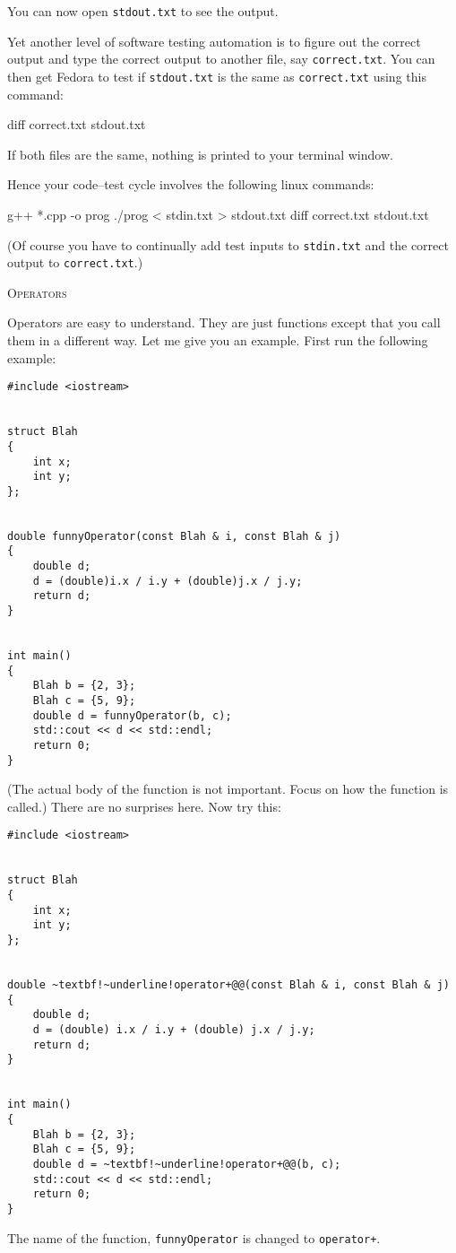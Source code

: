 You can now open \verb!stdout.txt! to see the output.

Yet another level of software testing automation is to figure out the correct
output and type the correct output to another file, say \verb!correct.txt!. You
can then get Fedora to test if \verb!stdout.txt! is the same as
\verb!correct.txt! using this command:
\begin{console}
diff correct.txt stdout.txt
\end{console}
If both files are the same, nothing is printed to your terminal window.

Hence your code--test cycle involves the following linux commands:
\begin{console}
g++ *.cpp -o prog
./prog < stdin.txt > stdout.txt
diff correct.txt stdout.txt
\end{console}

(Of course you have to continually add test inputs to \verb!stdin.txt! and the
correct output to \verb!correct.txt!.)




\newpage
\textsc{Operators}

Operators are easy to understand. They are just functions except that you call
them in a different way. Let me give you an example. First run the following
example:
\begin{Verbatim}[frame=single]
#include <iostream>


struct Blah
{
    int x;
    int y;
};


double funnyOperator(const Blah & i, const Blah & j)
{
    double d;
    d = (double)i.x / i.y + (double)j.x / j.y;
    return d;
}

  
int main()
{
    Blah b = {2, 3};
    Blah c = {5, 9};
    double d = funnyOperator(b, c);
    std::cout << d << std::endl;
    return 0;
}
\end{Verbatim}

(The actual body of the function is not important. Focus on how the function
is called.) There are no surprises here. Now try this:
\begin{Verbatim}[frame=single, commandchars=~!@]
#include <iostream>


struct Blah
{
    int x;
    int y;
};


double ~textbf!~underline!operator+@@(const Blah & i, const Blah & j)
{
    double d;
    d = (double) i.x / i.y + (double) j.x / j.y;
    return d;
}


int main()
{
    Blah b = {2, 3};
    Blah c = {5, 9};
    double d = ~textbf!~underline!operator+@@(b, c);
    std::cout << d << std::endl;
    return 0;
}
\end{Verbatim}
The name of the function, \verb!funnyOperator! is changed to \verb!operator+!.

